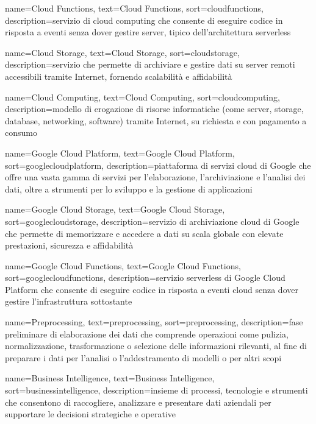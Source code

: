  {
    name=Cloud Functions,
    text=Cloud Functions,
    sort=cloudfunctions,
    description={servizio di cloud computing che consente di eseguire codice in risposta a eventi senza dover gestire server, tipico dell'architettura serverless}
}

 {
    name=Cloud Storage,
    text=Cloud Storage,
    sort=cloudstorage,
    description={servizio che permette di archiviare e gestire dati su server remoti accessibili tramite Internet, fornendo scalabilità e affidabilità}
}

 {
    name=Cloud Computing,
    text=Cloud Computing,
    sort=cloudcomputing,
    description={modello di erogazione di risorse informatiche (come server, storage, database, networking, software) tramite Internet, su richiesta e con pagamento a consumo}
}

 {
    name=Google Cloud Platform,
    text=Google Cloud Platform,
    sort=googlecloudplatform,
    description={piattaforma di servizi cloud di Google che offre una vasta gamma di servizi per l'elaborazione, l'archiviazione e l'analisi dei dati, oltre a strumenti per lo sviluppo e la gestione di applicazioni}
}

 {
    name=Google Cloud Storage,
    text=Google Cloud Storage,
    sort=googlecloudstorage,
    description={servizio di archiviazione cloud di Google che permette di memorizzare e accedere a dati su scala globale con elevate prestazioni, sicurezza e affidabilità}
}

 {
    name=Google Cloud Functions,
    text=Google Cloud Functions,
    sort=googlecloudfunctions,
    description={servizio serverless di Google Cloud Platform che consente di eseguire codice in risposta a eventi cloud senza dover gestire l'infrastruttura sottostante}
}

 {
    name=Preprocessing,
    text=preprocessing,
    sort=preprocessing,
    description={fase preliminare di elaborazione dei dati che comprende operazioni come pulizia, normalizzazione, trasformazione o selezione delle informazioni rilevanti, al fine di preparare i dati per l'analisi o l'addestramento di modelli o per altri scopi}
}

 {
    name=Business Intelligence,
    text=Business Intelligence,
    sort=businessintelligence,
    description={insieme di processi, tecnologie e strumenti che consentono di raccogliere, analizzare e presentare dati aziendali per supportare le decisioni strategiche e operative}
}


